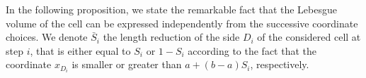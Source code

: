 \documentclass[paper=a4, fontsize=11pt]{scrartcl}
\begin{document}






In the following proposition, we state the remarkable fact that the Lebesgue volume of the cell can be expressed independently from the successive coordinate choices. We denote $\bar{S}_i$ the length reduction of the side $D_i$ of the considered cell at step $i$, that is either equal to $S_i$ or $1-S_i$ according to the fact that the coordinate $x_{D_i}$ is smaller or greater than $a+(b-a)S_i$, respectively.
\end{document}
